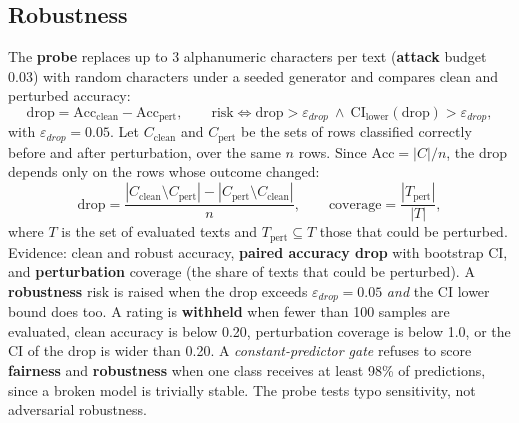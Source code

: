 \subsection{Robustness}
The \textbf{probe} replaces up to 3 alphanumeric characters per text (\textbf{attack} budget 0.03) with random characters under a seeded generator and compares clean and perturbed accuracy:
\begin{equation}
\mathrm{drop}=\mathrm{Acc}_{\mathrm{clean}}-\mathrm{Acc}_{\mathrm{pert}},\qquad
\text{risk}\iff \mathrm{drop}>\varepsilon_{drop}\ \wedge\ \mathrm{CI}_{\mathrm{lower}}(\mathrm{drop})>\varepsilon_{drop},\label{eq:drop}
\end{equation}
with $\varepsilon_{drop}=0.05$. Let $C_{\mathrm{clean}}$ and $C_{\mathrm{pert}}$ be the sets of rows classified correctly before and after perturbation, over the same $n$ rows. Since $\mathrm{Acc}=|C|/n$, the drop depends only on the rows whose outcome changed:
\begin{equation}
\mathrm{drop}=\frac{|C_{\mathrm{clean}}\setminus C_{\mathrm{pert}}|-|C_{\mathrm{pert}}\setminus C_{\mathrm{clean}}|}{n},\qquad
\mathrm{coverage}=\frac{|T_{\mathrm{pert}}|}{|T|},\label{eq:dropset}
\end{equation}
where $T$ is the set of evaluated texts and $T_{\mathrm{pert}}\subseteq T$ those that could be perturbed. Evidence: clean and robust accuracy, \textbf{paired accuracy drop} with bootstrap CI, and \textbf{perturbation} coverage (the share of texts that could be perturbed). A \textbf{robustness} risk is raised when the drop exceeds $\varepsilon_{drop}=0.05$ \emph{and} the CI lower bound does too. A rating is \textbf{withheld} when fewer than 100 samples are evaluated, clean accuracy is below 0.20, perturbation coverage is below 1.0, or the CI of the drop is wider than 0.20. A \emph{constant-predictor gate} refuses to score \textbf{fairness} and \textbf{robustness} when one class receives at least 98\% of predictions, since a broken model is trivially stable. The probe tests typo sensitivity, not adversarial robustness.


